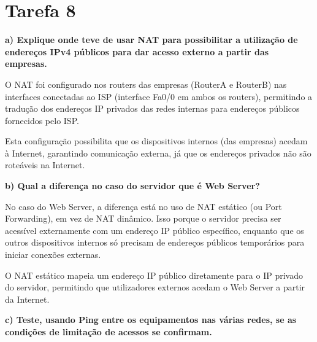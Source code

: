 \documentclass[11pt,english, openright, oneside]{book}
\begin{document}
\vspace{0.8cm}

\pagebreak
\section{Tarefa 8}
\vspace{0.2cm}

\textbf{a) Explique onde teve de usar NAT para possibilitar a utilização de endereços IPv4 públicos para dar acesso externo a partir das empresas.}
\vspace{0.2cm}

O NAT foi configurado nos routers das empresas (RouterA e RouterB) nas interfaces conectadas ao ISP (interface Fa0/0 em ambos os routers), permitindo a tradução dos endereços IP privados das redes internas para endereços públicos fornecidos pelo ISP. \par

Esta configuração possibilita que os dispositivos internos (das empresas) acedam à Internet, garantindo comunicação externa, já que os endereços privados não são roteáveis na Internet. \par



\vspace{0.8cm}

\textbf{b) Qual a diferença no caso do servidor que é Web Server?}
\vspace{0.2cm}

No caso do Web Server, a diferença está no uso de NAT estático (ou Port Forwarding), em vez de NAT dinâmico. Isso porque o servidor precisa ser acessível externamente com um endereço IP público específico, enquanto que os outros dispositivos internos só precisam de endereços públicos temporários para iniciar conexões externas. \par

O NAT estático mapeia um endereço IP público diretamente para o IP privado do servidor, permitindo que utilizadores externos acedam o Web Server a partir da Internet. \par



\vspace{0.8cm}

\textbf{c) Teste, usando Ping entre os equipamentos nas várias redes, se as condições de limitação de acessos se confirmam.}
\vspace{0.2cm}
\end{document}

